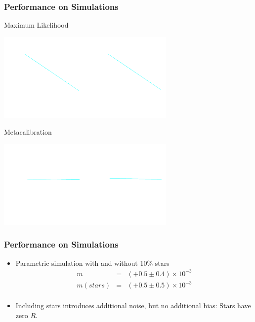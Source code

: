 \documentclass{beamer}
\begin{document}
\frame
{
    \frametitle{Performance on Simulations}
 
    {\normalsize Maximum Likelihood}
    \begin{center}
        \includegraphics[width=0.65\textwidth]{run-bd29mcal01-fit-m-c-nocorr-icolor.pdf}
    \end{center}

    {\normalsize Metacalibration}
    \begin{center}
        \includegraphics[width=0.65\textwidth]{run-bd29mcal01-fit-m-c-icolor.pdf}
    \end{center}

}



\frame
{
    \frametitle{Performance on Simulations}

 
    \begin{itemize}
            

        \item Parametric simulation with and without {\color{gold} 10\% stars}
             {\color{lightskyblue} 
                 \begin{eqnarray}
                     m        & = & (+0.5 \pm 0.4) \times 10^{-3} \nonumber \\
                     m(stars) & = & (+0.5 \pm 0.5) \times 10^{-3} \nonumber \\
                 \end{eqnarray}
             }

         \item Including stars introduces additional noise, but no
             additional bias: Stars have zero $R$.

    \end{itemize}

}
\end{document}
